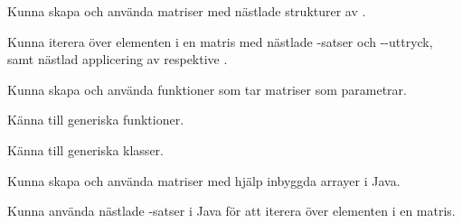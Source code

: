 

\ifPreSolution



\Exercise{\ExeWeekEIGHT}\label{exe:W08}

\begin{Goals}
\item Kunna skapa och använda matriser med nästlade strukturer av .
\item Kunna iterera över elementen i en matris med nästlade -satser och --uttryck, samt nästlad applicering av  respektive .
\item Kunna skapa och använda funktioner som tar matriser som parametrar.
\item Känna till generiska funktioner.
\item Känna till generiska klasser.
\item Kunna skapa och använda matriser med hjälp inbyggda arrayer i Java.
\item Kunna använda nästlade -satser i Java för att iterera över elementen i en matris.
\end{Goals}

\begin{Preparations}
\item {}
\end{Preparations}

\BasicTasks %

\else



\ExerciseSolution{\ExeWeekEIGHT}

\BasicTasks %


\fi






\QUESTBEGIN


